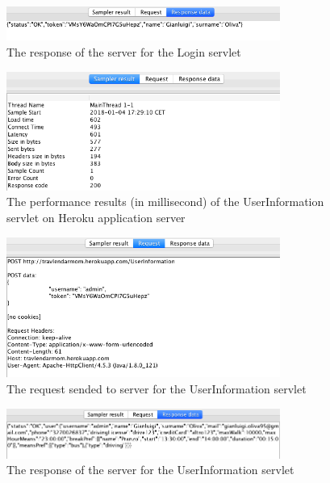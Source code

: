 \documentclass[numbers=noenddot, 12pt, a4paper, oneside]{scrbook}
\begin{document}
\begin{figure}[H]
\centering
\includegraphics[width=0.8\textwidth]{Test/LoginResp}
\caption{The response of the server for the Login servlet}
\end{figure}


\begin{figure}[H]
	\centering
	\includegraphics[width=0.8\textwidth]{Test/UserInformationMain}
	\caption{The performance results (in millisecond) of the UserInformation servlet on Heroku application server}
\end{figure}

\begin{figure}[H]
	\centering
	\includegraphics[width=0.8\textwidth]{Test/UserInformationReq}
	\caption{The request sended to server for the UserInformation servlet}
\end{figure}

\begin{figure}[H]
	\centering
	\includegraphics[width=0.8\textwidth]{Test/UserInformationResp}
	\caption{The response of the server for the UserInformation servlet}
\end{figure}
\end{document}
